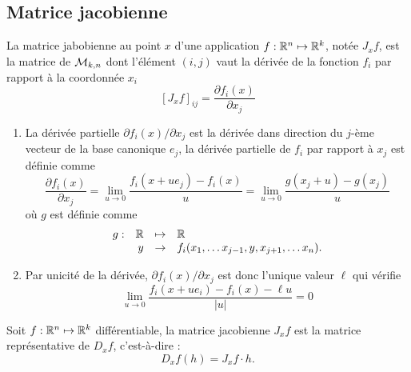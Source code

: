 \subsection{Matrice jacobienne} 

\begin{definition} \label{def:matriceJacobienne}
  La matrice jabobienne au point $x$ d'une application $f : \mathbb{R}^n \mapsto \mathbb{R}^k$, notée $J_xf$, est la matrice de $\mathcal{M}_{k, n}$ dont l'élément $(i, j)$ vaut la dérivée de la fonction $f_i$ par rapport à la coordonnée $x_i$
  $$
  [J_xf]_{ij} 
  = \frac{\partial f_i(x)}{\partial x_j}
  $$
\end{definition}

\remark
\begin{enumerate}
  \item La dérivée partielle $\partial f_i(x) / \partial x_j$ est la dérivée dans direction du $j$-ème vecteur de la base canonique $e_j$, 
  la dérivée partielle de $f_i$ par rapport à $x_j$ est définie comme
  $$
  \frac{\partial f_i(x)}{\partial x_j} 
  = \lim_{u \to 0} \frac{f_i(x + u e_j) - f_i(x)}{u}
  = \lim_{u \to 0} \frac{g(x_j + u) - g(x_j)}{u}
  $$
  où $g$ est définie comme
  $$
  \begin{array}{rrcl}
    g : & \mathbb{R} & \mapsto & \mathbb{R} \\
    & y & \to & f_i(x_1, \dots x_{j-1}, y, x_{j+1}, \dots x_n).
  \end{array}
  $$
  \item Par unicité de la dérivée, $\partial f_i(x) / \partial x_j$ est donc l'unique valeur $\ell$ qui vérifie
  \begin{equation} \label{eq:caracDeriveePartielle}
    \lim_{u \to 0} \frac{f_i(x + u e_i) - f_i(x) - \ell u}{|u|} = 0
  \end{equation}
\end{enumerate}

\begin{proposition} \label{prop:matriceJacobienne}
  Soit $f : \mathbb{R}^n \mapsto \mathbb{R}^k$ différentiable, la matrice jacobienne $J_xf$ est la matrice représentative de $D_xf$, c'est-à-dire :
  $$
  D_xf(h) = J_xf \cdot h.
  $$
\end{proposition}

